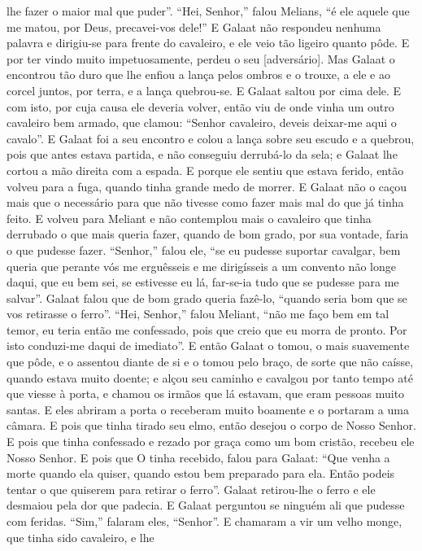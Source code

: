 lhe fazer o maior mal que puder”. “Hei, Senhor,” falou Melians, “é ele aquele
que me matou, por Deus, precavei-vos dele!” E Galaat não respondeu nenhuma
palavra e dirigiu-se para frente do cavaleiro, e ele veio tão ligeiro quanto
pôde. E por ter vindo muito impetuosamente, perdeu o seu [adversário]. Mas
Galaat o encontrou tão duro que lhe enfiou a lança pelos ombros e o trouxe, a
ele e ao corcel juntos, por terra, e a lança quebrou-se. E Galaat saltou por
cima dele. E com isto, por cuja causa ele deveria volver, então viu de onde
vinha um outro cavaleiro bem armado, que clamou: “Senhor cavaleiro, deveis
deixar-me aqui o cavalo”. E Galaat foi a seu encontro e colou a lança sobre seu
escudo e a quebrou, pois que antes estava partida, e não conseguiu derrubá-lo
da sela; e Galaat lhe cortou a mão direita com a espada. E porque ele sentiu
que estava ferido, então volveu para a fuga, quando tinha grande medo de
morrer. E Galaat não o caçou mais que o necessário para que não tivesse como
fazer mais mal do que já tinha feito. E volveu para Meliant e não contemplou
mais o cavaleiro que tinha derrubado o que mais queria fazer, quando de bom
grado, por sua vontade, faria o que pudesse fazer. “Senhor,” falou ele, “se eu
pudesse suportar cavalgar, bem queria que perante vós me erguêsseis e me
dirigísseis a um convento não longe daqui, que eu bem sei, se estivesse eu lá,
far-se-ia tudo que se pudesse para me salvar”. Galaat falou que de bom grado
queria fazê-lo, “quando seria bom que se vos retirasse o ferro”. “Hei, Senhor,”
falou Meliant, “não me faço bem em tal temor, eu teria então me confessado,
pois que creio que eu morra de pronto. Por isto conduzi-me daqui de imediato”.
E então Galaat o tomou, o mais suavemente que pôde, e o assentou diante de si e
o tomou pelo braço, de sorte que não caísse, quando estava muito doente; e
alçou seu caminho e cavalgou por tanto tempo até que viesse à porta, e chamou
os irmãos que lá estavam, que eram pessoas muito santas. E eles abriram a porta
o receberam muito boamente e o portaram a uma câmara. E pois que tinha tirado
seu elmo, então desejou o corpo de Nosso Senhor. E pois que tinha confessado e
rezado por graça como um bom cristão, recebeu ele Nosso Senhor. E pois que O
tinha recebido, falou para Galaat: ``Que venha a morte quando ela quiser, quando
estou bem preparado para ela. Então podeis tentar o que quiserem para retirar o
ferro”. Galaat retirou-lhe o ferro e ele desmaiou pela dor que padecia. E
Galaat perguntou se ninguém ali que pudesse com feridas. “Sim,” falaram eles,
“Senhor”. E chamaram a vir um velho monge, que tinha sido cavaleiro, e lhe
